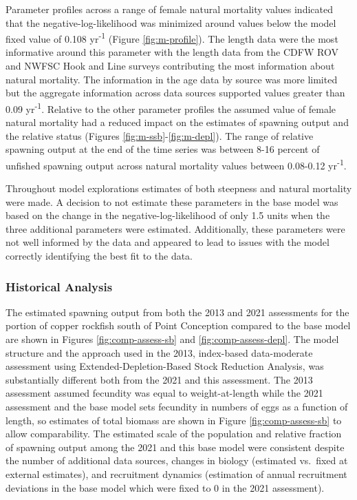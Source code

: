 \documentclass[11pt,
  english,
  letterpaper,
]{article}
\begin{document}
Parameter profiles across a range of female natural mortality values indicated that the negative-log-likelihood was minimized around values below the model fixed value of 0.108 yr\textsuperscript{-1} (Figure \ref{fig:m-profile}). The length data were the most informative around this parameter with the length data from the CDFW ROV and NWFSC Hook and Line surveys contributing the most information about natural mortality. The information in the age data by source was more limited but the aggregate information across data sources supported values greater than 0.09 yr\textsuperscript{-1}. Relative to the other parameter profiles the assumed value of female natural mortality had a reduced impact on the estimates of spawning output and the relative status (Figures \ref{fig:m-ssb}-\ref{fig:m-depl}). The range of relative spawning output at the end of the time series was between 8-16 percent of unfished spawning output across natural mortality values between 0.08-0.12 yr\textsuperscript{-1}.

Throughout model explorations estimates of both steepness and natural mortality were made. A decision to not estimate these parameters in the base model was based on the change in the negative-log-likelihood of only 1.5 units when the three additional parameters were estimated. Additionally, these parameters were not well informed by the data and appeared to lead to issues with the model correctly identifying the best fit to the data.

\hypertarget{historical-analysis}{%
\subsubsection{Historical Analysis}\label{historical-analysis}}

The estimated spawning output from both the 2013 and 2021 assessments for the portion of copper rockfish south of Point Conception compared to the base model are shown in Figures \ref{fig:comp-assess-sb} and \ref{fig:comp-assess-depl}. The model structure and the approach used in the 2013, index-based data-moderate assessment using Extended-Depletion-Based Stock Reduction Analysis, was substantially different both from the 2021 and this assessment. The 2013 assessment assumed fecundity was equal to weight-at-length while the 2021 assessment and the base model sets fecundity in numbers of eggs as a function of length, so estimates of total biomass are shown in Figure \ref{fig:comp-assess-sb} to allow comparability. The estimated scale of the population and relative fraction of spawning output among the 2021 and this base model were consistent despite the number of additional data sources, changes in biology (estimated vs.~fixed at external estimates), and recruitment dynamics (estimation of annual recruitment deviations in the base model which were fixed to 0 in the 2021 assessment).
\end{document}
